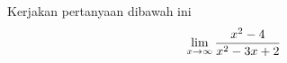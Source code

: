 \item
Kerjakan pertanyaan dibawah ini
\begin{equation}
\lim_{x\to\infty} \frac{x^2-4}{x^2-3x+2} \\ \nonumber
\end{equation}
